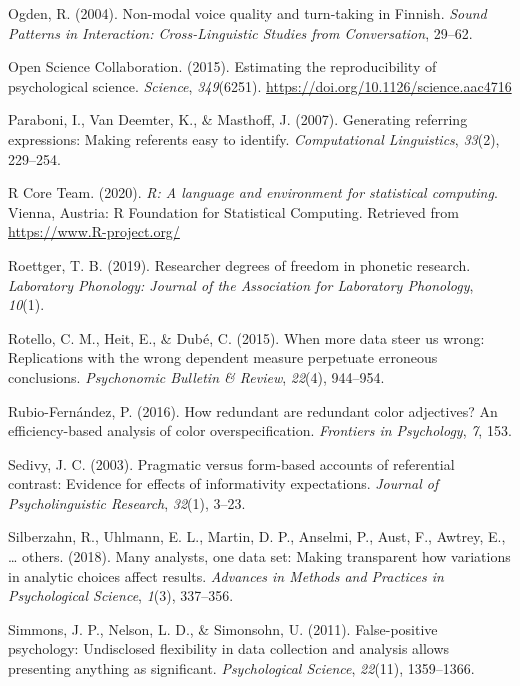 \documentclass[
  english,
  man,floatsintext]{apa6}
\begin{document}
\leavevmode\hypertarget{ref-ogden2004}{}%
Ogden, R. (2004). Non-modal voice quality and turn-taking in Finnish. \emph{Sound Patterns in Interaction: Cross-Linguistic Studies from Conversation}, 29--62.

\leavevmode\hypertarget{ref-open2015estimating}{}%
Open Science Collaboration. (2015). Estimating the reproducibility of psychological science. \emph{Science}, \emph{349}(6251). \url{https://doi.org/10.1126/science.aac4716}

\leavevmode\hypertarget{ref-paraboni2007generating}{}%
Paraboni, I., Van Deemter, K., \& Masthoff, J. (2007). Generating referring expressions: Making referents easy to identify. \emph{Computational Linguistics}, \emph{33}(2), 229--254.

\leavevmode\hypertarget{ref-R-base}{}%
R Core Team. (2020). \emph{R: A language and environment for statistical computing}. Vienna, Austria: R Foundation for Statistical Computing. Retrieved from \url{https://www.R-project.org/}

\leavevmode\hypertarget{ref-roettger2019researcher}{}%
Roettger, T. B. (2019). Researcher degrees of freedom in phonetic research. \emph{Laboratory Phonology: Journal of the Association for Laboratory Phonology}, \emph{10}(1).

\leavevmode\hypertarget{ref-rotello2015more}{}%
Rotello, C. M., Heit, E., \& Dubé, C. (2015). When more data steer us wrong: Replications with the wrong dependent measure perpetuate erroneous conclusions. \emph{Psychonomic Bulletin \& Review}, \emph{22}(4), 944--954.

\leavevmode\hypertarget{ref-rubio2016redundant}{}%
Rubio-Fernández, P. (2016). How redundant are redundant color adjectives? An efficiency-based analysis of color overspecification. \emph{Frontiers in Psychology}, \emph{7}, 153.

\leavevmode\hypertarget{ref-sedivy2003pragmatic}{}%
Sedivy, J. C. (2003). Pragmatic versus form-based accounts of referential contrast: Evidence for effects of informativity expectations. \emph{Journal of Psycholinguistic Research}, \emph{32}(1), 3--23.

\leavevmode\hypertarget{ref-silberzahn2018many}{}%
Silberzahn, R., Uhlmann, E. L., Martin, D. P., Anselmi, P., Aust, F., Awtrey, E., \ldots{} others. (2018). Many analysts, one data set: Making transparent how variations in analytic choices affect results. \emph{Advances in Methods and Practices in Psychological Science}, \emph{1}(3), 337--356.

\leavevmode\hypertarget{ref-simmons2011false}{}%
Simmons, J. P., Nelson, L. D., \& Simonsohn, U. (2011). False-positive psychology: Undisclosed flexibility in data collection and analysis allows presenting anything as significant. \emph{Psychological Science}, \emph{22}(11), 1359--1366.
\end{document}
